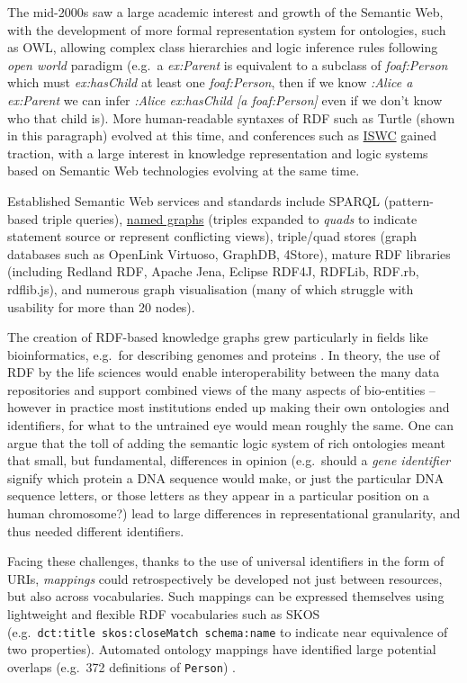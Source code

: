 \documentclass[fleqn,10pt,lineno]{wlpeerjlua}
\begin{document}
The mid-2000s saw a large academic interest and growth of the Semantic Web, with the development of more formal representation system for ontologies, such as OWL, allowing complex class hierarchies and logic inference rules following \emph{open world} paradigm (e.g.~a \emph{ex:Parent} is equivalent to a subclass of \emph{foaf:Person} which must \emph{ex:hasChild} at least one \emph{foaf:Person}, then if we know \emph{:Alice a ex:Parent} we can infer \emph{:Alice ex:hasChild {[}a foaf:Person{]}} even if we don't know who that child is). More human-readable syntaxes of RDF such as Turtle (shown in this paragraph) evolved at this time, and conferences such as \href{https://iswc2022.semanticweb.org/}{ISWC} \autocite{horrocksSemanticWebISWC2002} gained traction, with a large interest in knowledge representation and logic systems based on Semantic Web technologies evolving at the same time.

Established Semantic Web services and standards include SPARQL \autocite{w3-sparql11-overview} (pattern-based triple queries), \href{https://www.w3.org/TR/rdf11-concepts/\#section-dataset}{named graphs} (triples expanded to \emph{quads} to indicate statement source or represent conflicting views), triple/quad stores (graph databases such as OpenLink Virtuoso, GraphDB, 4Store), mature RDF libraries (including Redland RDF, Apache Jena, Eclipse RDF4J, RDFLib, RDF.rb, rdflib.js), and numerous graph visualisation (many of which struggle with usability for more than 20 nodes).

The creation of RDF-based knowledge graphs grew particularly in fields like bioinformatics, e.g.~for describing genomes and proteins \autocite{gobleStateNationData2008c,williamsOpenPHACTSSemantic2012c}. In theory, the use of RDF by the life sciences would enable interoperability between the many data repositories and support combined views of the many aspects of bio-entities -- however in practice most institutions ended up making their own ontologies and identifiers, for what to the untrained eye would mean roughly the same. One can argue that the toll of adding the semantic logic system of rich ontologies meant that small, but fundamental, differences in opinion (e.g.~should a \emph{gene identifier} signify which protein a DNA sequence would make, or just the particular DNA sequence letters, or those letters as they appear in a particular position on a human chromosome?) lead to large differences in representational granularity, and thus needed different identifiers.

Facing these challenges, thanks to the use of universal identifiers in the form of URIs, \emph{mappings} could retrospectively be developed not just between resources, but also across vocabularies. Such mappings can be expressed themselves using lightweight and flexible RDF vocabularies such as SKOS \autocite{w3-skos-primer} (e.g.~\texttt{dct:title\ skos:closeMatch\ schema:name} to indicate near equivalence of two properties). Automated ontology mappings have identified large potential overlaps (e.g.~372 definitions of \texttt{Person}) \autocite{huHowMatchableAre2011a} .
\end{document}
